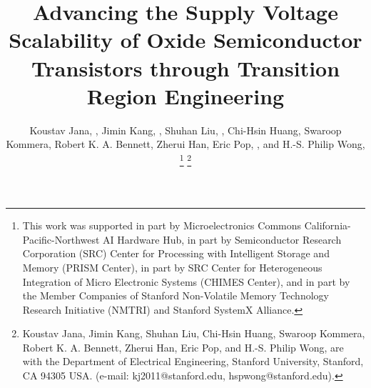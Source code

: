 \documentclass[journal,twoside,web]{ieeecolor}
\begin{document}
\title{Advancing the Supply Voltage Scalability of Oxide Semiconductor Transistors through Transition Region Engineering
}
\author{Koustav Jana, , Jimin Kang, , Shuhan Liu, , Chi-Hsin Huang, Swaroop Kommera, Robert K. A. Bennett, Zherui Han, Eric Pop, , and H.-S. Philip Wong, 
\thanks{This work was supported in part by Microelectronics Commons California-Pacific-Northwest AI Hardware Hub, in part by Semiconductor Research Corporation (SRC) Center for Processing with Intelligent Storage and Memory (PRISM Center), in part by SRC Center for Heterogeneous Integration of Micro Electronic Systems (CHIMES Center), and in part by the Member Companies of Stanford Non-Volatile Memory Technology Research Initiative (NMTRI) and Stanford SystemX Alliance.}
\thanks{ Koustav Jana, Jimin Kang, Shuhan Liu, Chi-Hsin Huang, Swaroop Kommera, Robert K. A. Bennett, Zherui Han, Eric Pop, and H.-S. Philip Wong, are with the Department of Electrical Engineering, Stanford University, Stanford, CA 94305 USA. (e-mail: kj2011@stanford.edu,  hspwong@stanford.edu). } }

\maketitle
\end{document}
